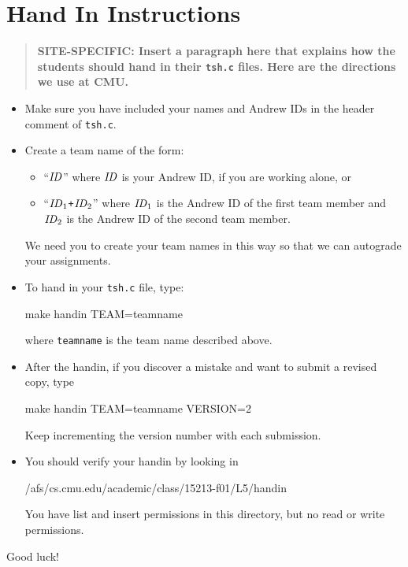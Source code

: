 \documentclass[11pt]{article}
\begin{document}
\section*{Hand In Instructions}

\begin{quote}
\bf SITE-SPECIFIC: Insert a paragraph here that explains how the students
should hand in their \texttt{tsh.c} files.
Here are the directions we use at CMU.
\end{quote}

\begin{itemize}
\item Make sure you have included your names and Andrew IDs in the
header comment of {\tt tsh.c}.

\item Create a team name of the form:
\begin{itemize}
\item ``${\it ID}$'' where ${\it ID}$ is your Andrew ID, if you are
working alone, or
\item ``${\it ID}_1${\tt +}${\it ID}_2$'' where ${\it ID}_1$ is the
Andrew ID of the first team member and ${\it ID}_2$ is the Andrew ID
of the second team member.  
\end{itemize}
We need you to create your team names in this way so that we can
autograde your assignments.

\item To hand in your {\tt tsh.c} file, type:
\begin{tty}
make handin TEAM=teamname
\end{tty}
where \verb|teamname| is the team name described above.

\item After the handin, if you discover a mistake and want to
submit a revised copy, type
\begin{tty}
make handin TEAM=teamname VERSION=2
\end{tty}
Keep incrementing the version number with each submission.

\item You should verify your handin by looking in 
\begin{tty}
/afs/cs.cmu.edu/academic/class/15213-f01/L5/handin
\end{tty}
You have list and insert permissions in this directory, but no
read or write permissions.
\end{itemize}
Good luck! 
\end{document}

